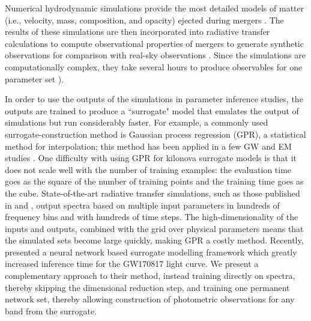 \documentclass[fleqn,usenatbib,useAMS]{mnras}
\begin{document}
Numerical hydrodynamic simulations provide the most detailed models of matter (i.e., velocity, mass, composition, and opacity) ejected during mergers 
\citep[e.g.,][]{dietrichModelingDynamicalEjecta2017, perego2017gfoAnisotropicThreecomponent2017, kawaguchiLowmassBinaryNeutron2021, tanakaSystematicOpacityCalculations2020}.
The results of these simulations are then incorporated into radiative transfer calculations to compute observational properties of mergers \citep[e.g.,][]{bullaPOSSISPredictingSpectra2019, kasenOriginHeavyElements2017, kawaguchiModelsKilonovaMacronova2016} to generate synthetic observations for comparison with real-sky observations \citep[e.g.,][]{raaijmakersChallengesAheadMultimessenger2021}.
Since the simulations are computationally complex, they take several hours to produce observables for one parameter set \citep{bullaPOSSISPredictingSpectra2019}). 


In order to use the outputs of the simulations in parameter inference studies, the outputs are trained to produce a ``surrogate" model that emulates the output of simulations but run considerably faster.
For example, a commonly used surrogate-construction method is Gaussian process regression (GPR), a statistical method for interpolation; this method has been applied in a few GW and EM studies \citep{doctorStatisticalGravitationalWaveform2017, coughlinConstraintsNeutronStar2018, dietrichMultimessengerConstraintsNeutronstar2020}. 
One difficulty with using GPR for kilonova surrogate models is that it does not scale well with the number of training examples: the evaluation time goes as the square of the number of training points and the training time goes as the cube. 
State-of-the-art radiative transfer simulations, such as those published in \citet{dietrichMultimessengerConstraintsNeutronstar2020} and \citet{anandOpticalFollowupNeutron2021}, output spectra based on multiple input parameters in hundreds of frequency bins and with hundreds of time steps. 
The high-dimensionality of the inputs and outputs, combined with the grid over physical parameters means that the simulated sets become large quickly, making GPR a costly method.
Recently, \cite{almuallaUsingNeuralNetworks2021} presented a neural network based surrogate modelling framework which greatly increased inference time for the GW170817 light curve. 
We present a complementary approach to their method, instead training directly on spectra, thereby skipping the dimensional reduction step, and training one permanent network set, thereby allowing construction of photometric observations for any band from the surrogate. 
\end{document}
